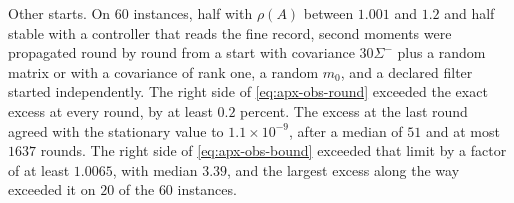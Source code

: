 \begin{numcheck}
Other starts. On $60$ instances, half with $\rho(A)$ between $1.001$ and $1.2$ and half stable with a controller that reads the fine record, second moments were propagated round by round from a start with covariance $30\Sigma^-$ plus a random matrix or with a covariance of rank one, a random $m_0$, and a declared filter started independently. The right side of \eqref{eq:apx-obs-round} exceeded the exact excess at every round, by at least $0.2$ percent. The excess at the last round agreed with the stationary value to $1.1\times10^{-9}$, after a median of $51$ and at most $1637$ rounds. The right side of \eqref{eq:apx-obs-bound} exceeded that limit by a factor of at least $1.0065$, with median $3.39$, and the largest excess along the way exceeded it on $20$ of the $60$ instances.
\end{numcheck}

